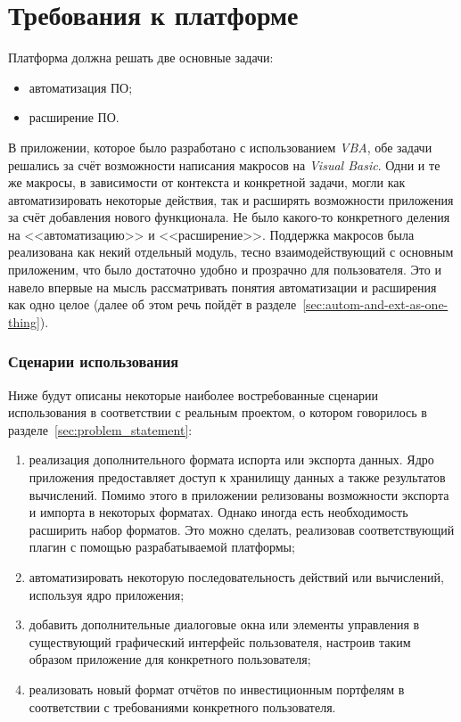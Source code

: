 \section{Требования к платформе}
\label{sec:pl_requirements}

Платформа должна решать две основные задачи:
\begin{itemize}
 \item автоматизация ПО;
 \item расширение ПО.
\end{itemize}

В приложении, которое было разработано с использованием {\it VBA}, обе задачи решались за счёт возможности написания макросов на {\it Visual Basic}. Одни и те же макросы, в зависимости от контекста и конкретной задачи, могли как автоматизировать некоторые действия, так и расширять возможности приложения за счёт добавления нового функционала. Не было какого-то конкретного деления на <<автоматизацию>> и <<расширение>>. Поддержка макросов была реализована как некий отдельный модуль, тесно взаимодействующий с основным приложеним, что было достаточно удобно и прозрачно для пользователя. Это и навело впервые на мысль рассматривать понятия автоматизации и расширения как одно целое (далее об этом речь пойдёт в разделе~\ref{sec:autom-and-ext-as-one-thing}).

\subsubsection{Сценарии использования}
Ниже будут описаны некоторые наиболее востребованные сценарии использования в соответствии с реальным проектом, о котором говорилось в разделе~\ref{sec:problem_statement}:
\begin{enumerate}
 \item реализация дополнительного формата испорта или экспорта данных. Ядро приложения предоставляет доступ к хранилищу данных а также результатов вычислений. Помимо этого в приложении релизованы возможности экспорта и импорта в некоторых форматах. Однако иногда есть необходимость расширить набор форматов. Это можно сделать, реализовав соответствующий плагин с помощью разрабатываемой платформы;
 \item автоматизировать некоторую последовательность действий или вычислений, используя ядро приложения;
 \item добавить дополнительные диалоговые окна или элементы управления в существующий графический интерфейс пользователя, настроив таким образом приложение для конкретного пользователя;
 \item реализовать новый формат отчётов по инвестиционным портфелям в соответствии с требованиями конкретного пользователя.
\end{enumerate}


